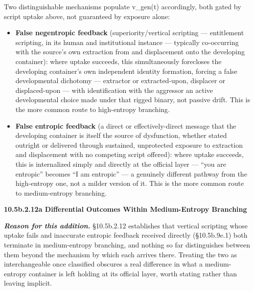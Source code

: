 \documentclass[
]{article}
\begin{document}
Two distinguishable mechanisms populate v\_gen(t) accordingly, both
gated by script uptake above, not guaranteed by exposure alone:

\begin{itemize}
\item
  \textbf{False negentropic feedback} (superiority/vertical
  scripting --- entitlement scripting, in its human and institutional
  instance --- typically co-occurring with the source's own extraction
  from and displacement onto the developing container): where uptake
  succeeds, this simultaneously forecloses the developing container's
  own independent identity formation, forcing a false developmental
  dichotomy --- extractor or extracted-upon, displacer or displaced-upon
  --- with identification with the aggressor an active developmental
  choice made under that rigged binary, not passive drift. This is the
  more common route to high-entropy branching.
\item
  \textbf{False entropic feedback} (a direct or effectively-direct
  message that the developing container is itself the source of
  dysfunction, whether stated outright or delivered through sustained,
  unprotected exposure to extraction and displacement with no competing
  script offered): where uptake succeeds, this is internalized simply
  and directly at the official layer --- ``you are entropic'' becomes
  ``I am entropic'' --- a genuinely different pathway from the
  high-entropy one, not a milder version of it. This is the more common
  route to medium-entropy branching.
\end{itemize}

\textbf{10.5b.2.12a Differential Outcomes Within Medium-Entropy
Branching}

\emph{\textbf{Reason for this addition.}} §10.5b.2.12 establishes that
vertical scripting whose uptake fails and inaccurate entropic feedback
received directly (§10.5b.9e.1) both terminate in medium-entropy
branching, and nothing so far distinguishes between them beyond the
mechanism by which each arrives there. Treating the two as
interchangeable once classified obscures a real difference in what a
medium-entropy container is left holding at its official layer, worth
stating rather than leaving implicit.
\end{document}
